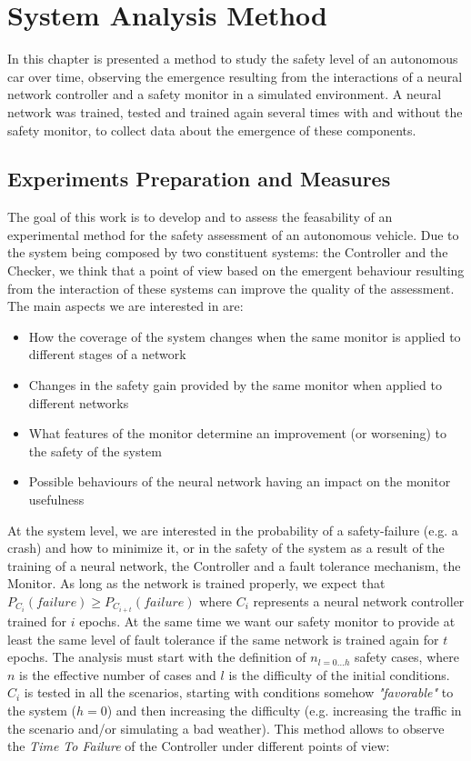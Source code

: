 \chapter{System Analysis Method}

In this chapter is presented a method to study the safety level of an autonomous car over time, observing the emergence resulting from the interactions of a neural network controller and a safety monitor in a simulated environment.\newline
A neural network was trained, tested and trained again several times with and without the safety monitor, to collect data about the emergence of these components.

\section{Experiments Preparation and Measures}

The goal of this work is to develop and to assess the feasability of an experimental method for the safety assessment of an autonomous vehicle. Due to the system being composed by two constituent systems: the Controller and the Checker, we think that a point of view based on the emergent behaviour resulting from the interaction of these systems can improve the quality of the assessment.\newline
The main aspects we are interested in are:

\begin{itemize}
	\item How the coverage of the system changes when the same monitor is applied to different stages of a network
	\item Changes in the safety gain provided by the same monitor when applied to different networks
	\item What features of the monitor determine an improvement (or worsening) to the safety of the system
	\item Possible behaviours of the neural network having an impact on the monitor usefulness
\end{itemize}

At the system level, we are interested in the probability of a safety-failure (e.g. a crash) and how to minimize it, or in the safety of the system as a result of the training of a neural network, the Controller and a fault tolerance mechanism, the Monitor. As long as the network is trained properly, we expect that $P_{C_{i}}(failure) \geq P_{C_{i+t}}(failure)$ where $C_{i}$ represents a neural network controller trained for $i$ epochs. At the same time we want our safety monitor to provide at least the same level of fault tolerance if the same network is trained again for $t$ epochs.\newline
The analysis must start with the definition of $n_{l=0\dots h}$ safety cases, where $n$ is the effective number of cases and $l$ is the difficulty of the initial conditions. $C_{i}$ is tested in all the scenarios, starting with conditions somehow \textsl{"favorable"} to the system ($h=0$) and then increasing the difficulty (e.g. increasing the traffic in the scenario and/or simulating a bad weather). This method allows to observe the \textsl{Time To Failure} of the Controller under different points of view:

